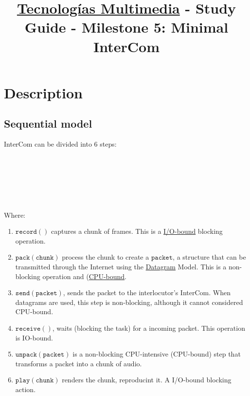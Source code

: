 \title{\href{https://www.ual.es/estudios/grados/presentacion/plandeestudios/asignatura/4015/40154321?idioma=zh_CN}{Tecnologías Multimedia} - Study Guide - Milestone 5: Minimal InterCom}

\maketitle

\section{Description}

\subsection{Sequential model}

InterCom can be divided into 6 steps:

\begin{pseudocode}[display]{}{}
  \BEGIN
     \GETS {}\\
     \GETS {}\\
    \\
     \GETS {}\\
     \GETS {}\\
  \END
\end{pseudocode}

Where:

\begin{enumerate}
\item $\mathtt{record()}$ captures a chunk of frames. This is a
  \href{https://en.wikipedia.org/wiki/I/O_bound}{I/O-bound} blocking
  operation.
\item $\mathtt{pack(chunk)}$ process the chunk to create a
  $\mathtt{packet}$, a structure that can be transmitted through the
  Internet using the
  \href{https://en.wikipedia.org/wiki/Datagram}{Datagram} Model. This
  is a non-blocking operation and
  (\href{https://en.wikipedia.org/wiki/CPU-bound}{CPU-bound}.
\item $\mathtt{send(packet)}$, sends the packet to the interlocutor's
  InterCom. When datagrams are used, this step is non-blocking,
  although it cannot considered CPU-bound.
\item $\mathtt{receive()}$, waits (blocking the task) for a incoming
  packet. This operation is IO-bound.
\item $\mathtt{unpack(packet)}$ is a non-blocking CPU-intensive
  (CPU-bound) step that transforms a packet into a chunk of audio.
\item $\mathtt{play(chunk)}$ renders the chunk, reproducint it. A
  I/O-bound blocking action.
\end{enumerate}
  
